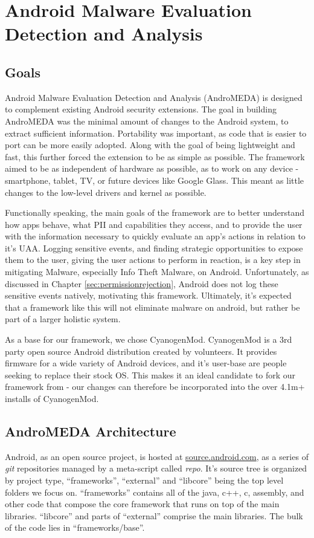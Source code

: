 \chapter{Android Malware Evaluation Detection and Analysis}
\label{sec:architecture}

\section{Goals}
Android Malware Evaluation Detection and Analysis (AndroMEDA) is designed to complement existing Android security extensions\citep{All security extensions}. The goal in building AndroMEDA was the minimal amount of changes to the Android system, to extract sufficient information. Portability was important, as code that is easier to port can be more easily adopted. Along with the goal of being lightweight and fast, this further forced the extension to be as simple as possible. The framework aimed to be as independent of hardware as possible, as to work on any device - smartphone, tablet, TV, or future devices like Google Glass. This meant as little changes to the low-level drivers and kernel as possible.

Functionally speaking, the main goals of the framework are to better understand how apps behave, what PII and capabilities they access, and to provide the user with the information necessary to quickly evaluate an app's actions in relation to it's UAA. Logging sensitive events, and finding strategic opportunities to expose them to the user, giving the user actions to perform in reaction, is a key step in mitigating Malware, especially Info Theft Malware, on Android. Unfortunately, as discussed in Chapter \ref{sec:permissionrejection}, Android does not log these sensitive events natively, motivating this framework. Ultimately, it's expected that a framework like this will not eliminate malware on android, but rather be part of a larger holistic system.

As a base for our framework, we chose CyanogenMod\citep{cyanogenmod}. CyanogenMod is a 3rd party open source Android distribution created by volunteers. It provides firmware for a wide variety of Android devices, and it's user-base are people seeking to replace their stock OS. This makes it an ideal candidate to fork our framework from - our changes can therefore be incorporated into the over 4.1m+ installs of CyanogenMod\citep{cyanogenmodstats}.

\section{AndroMEDA Architecture}
Android, as an open source project, is hosted at \url{source.android.com}\citep{androidsource}, as a series of \textit{git} repositories managed by a meta-script called \textit{repo}. It's source tree is organized by project type, ``frameworks'', ``external'' and ``libcore'' being the top level folders we focus on. ``frameworks'' contains all of the java, c++, c, assembly, and other code that compose the core framework that runs on top of the main libraries. ``libcore'' and parts of ``external'' comprise the main libraries. The bulk of the code lies in ``frameworks/base''.


